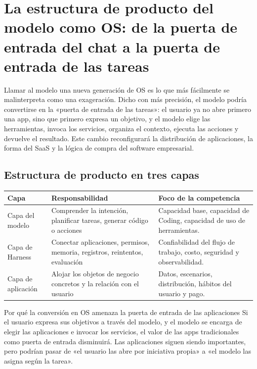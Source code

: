 \section{La estructura de producto del modelo como OS: de la puerta de entrada del chat a la puerta de entrada de las tareas}

Llamar al modelo una nueva generación de OS es lo que más fácilmente se malinterpreta como una exageración. Dicho con más precisión, el modelo podría convertirse en la «puerta de entrada de las tareas»: el usuario ya no abre primero una app, sino que primero expresa un objetivo, y el modelo elige las herramientas, invoca los servicios, organiza el contexto, ejecuta las acciones y devuelve el resultado. Este cambio reconfigurará la distribución de aplicaciones, la forma del SaaS y la lógica de compra del software empresarial.

\subsection{Estructura de producto en tres capas}

\noindent\begin{longtable}{p{}p{}p{}}
\toprule
Capa & Responsabilidad & Foco de la competencia \\
\midrule
Capa del modelo & Comprender la intención, planificar tareas, generar código o acciones & Capacidad base, capacidad de Coding, capacidad de uso de herramientas. \\
Capa de Harness & Conectar aplicaciones, permisos, memoria, registros, reintentos, evaluación & Confiabilidad del flujo de trabajo, costo, seguridad y observabilidad. \\
Capa de aplicación & Alojar los objetos de negocio concretos y la relación con el usuario & Datos, escenarios, distribución, hábitos del usuario y pago. \\
\bottomrule
\end{longtable}

\begin{knowledgebox}{Por qué la conversión en OS amenaza la puerta de entrada de las aplicaciones}
Si el usuario expresa sus objetivos a través del modelo, y el modelo se encarga de elegir las aplicaciones e invocar los servicios, el valor de las apps tradicionales como puerta de entrada disminuirá. Las aplicaciones siguen siendo importantes, pero podrían pasar de «el usuario las abre por iniciativa propia» a «el modelo las asigna según la tarea».
\end{knowledgebox}

